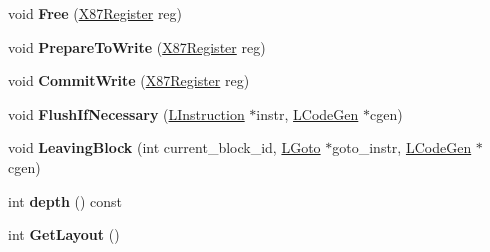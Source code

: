 \begin{DoxyCompactItemize}
\item 
void {\bfseries Free} (\hyperlink{structv8_1_1internal_1_1_double_register}{X87\+Register} reg)\hypertarget{classv8_1_1internal_1_1_l_code_gen_1_1_x87_stack_a2d8ed48df6b43cbbe1a3abb9ec45671d}{}\label{classv8_1_1internal_1_1_l_code_gen_1_1_x87_stack_a2d8ed48df6b43cbbe1a3abb9ec45671d}

\item 
void {\bfseries Prepare\+To\+Write} (\hyperlink{structv8_1_1internal_1_1_double_register}{X87\+Register} reg)\hypertarget{classv8_1_1internal_1_1_l_code_gen_1_1_x87_stack_added8f0956d30214d910825bbb25a7f9}{}\label{classv8_1_1internal_1_1_l_code_gen_1_1_x87_stack_added8f0956d30214d910825bbb25a7f9}

\item 
void {\bfseries Commit\+Write} (\hyperlink{structv8_1_1internal_1_1_double_register}{X87\+Register} reg)\hypertarget{classv8_1_1internal_1_1_l_code_gen_1_1_x87_stack_a6356c65d4ceb03037284c416cc97858f}{}\label{classv8_1_1internal_1_1_l_code_gen_1_1_x87_stack_a6356c65d4ceb03037284c416cc97858f}

\item 
void {\bfseries Flush\+If\+Necessary} (\hyperlink{classv8_1_1internal_1_1_l_instruction}{L\+Instruction} $\ast$instr, \hyperlink{classv8_1_1internal_1_1_l_code_gen}{L\+Code\+Gen} $\ast$cgen)\hypertarget{classv8_1_1internal_1_1_l_code_gen_1_1_x87_stack_a148685257cd0fd4ab03b583b73012127}{}\label{classv8_1_1internal_1_1_l_code_gen_1_1_x87_stack_a148685257cd0fd4ab03b583b73012127}

\item 
void {\bfseries Leaving\+Block} (int current\+\_\+block\+\_\+id, \hyperlink{classv8_1_1internal_1_1_l_goto}{L\+Goto} $\ast$goto\+\_\+instr, \hyperlink{classv8_1_1internal_1_1_l_code_gen}{L\+Code\+Gen} $\ast$cgen)\hypertarget{classv8_1_1internal_1_1_l_code_gen_1_1_x87_stack_acee287c98f339246aa452a1eb655f0e4}{}\label{classv8_1_1internal_1_1_l_code_gen_1_1_x87_stack_acee287c98f339246aa452a1eb655f0e4}

\item 
int {\bfseries depth} () const \hypertarget{classv8_1_1internal_1_1_l_code_gen_1_1_x87_stack_afe3de6b83c9eeefd71bf6ace812a6113}{}\label{classv8_1_1internal_1_1_l_code_gen_1_1_x87_stack_afe3de6b83c9eeefd71bf6ace812a6113}

\item 
int {\bfseries Get\+Layout} ()\hypertarget{classv8_1_1internal_1_1_l_code_gen_1_1_x87_stack_aad2f27d4cf0cf230b457507ee0514039}{}\label{classv8_1_1internal_1_1_l_code_gen_1_1_x87_stack_aad2f27d4cf0cf230b457507ee0514039}


\end{DoxyCompactItemize}
